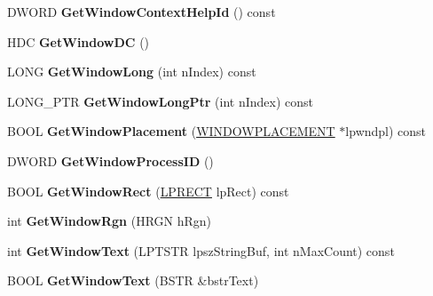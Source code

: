 \begin{DoxyCompactItemize}
D\+W\+O\+RD {\bfseries Get\+Window\+Context\+Help\+Id} () const
\item 
\mbox{\label{class_a_t_l_1_1_c_window_a53978589ef477e3efd9026ae5cb3b772}} 
H\+DC {\bfseries Get\+Window\+DC} ()
\item 
\mbox{\label{class_a_t_l_1_1_c_window_ac70f93a43d47796067d2bdfcb0f471dd}} 
L\+O\+NG {\bfseries Get\+Window\+Long} (int n\+Index) const
\item 
\mbox{\label{class_a_t_l_1_1_c_window_a8e1cdcc97deb1790b73d360453918278}} 
L\+O\+N\+G\+\_\+\+P\+TR {\bfseries Get\+Window\+Long\+Ptr} (int n\+Index) const
\item 
\mbox{\label{class_a_t_l_1_1_c_window_a39f860355ac97945551c84336b110a91}} 
B\+O\+OL {\bfseries Get\+Window\+Placement} (\hyperlink{struct___w_i_n_d_o_w_p_l_a_c_e_m_e_n_t}{W\+I\+N\+D\+O\+W\+P\+L\+A\+C\+E\+M\+E\+NT} $\ast$lpwndpl) const
\item 
\mbox{\label{class_a_t_l_1_1_c_window_aab1857d7335028be41136dfda1830ad2}} 
D\+W\+O\+RD {\bfseries Get\+Window\+Process\+ID} ()
\item 
\mbox{\label{class_a_t_l_1_1_c_window_a7d85282978c6e7f6feefef80c3824979}} 
B\+O\+OL {\bfseries Get\+Window\+Rect} (\hyperlink{structtag_r_e_c_t}{L\+P\+R\+E\+CT} lp\+Rect) const
\item 
\mbox{\label{class_a_t_l_1_1_c_window_a583da937210a043c288d2ab2187c9257}} 
int {\bfseries Get\+Window\+Rgn} (H\+R\+GN h\+Rgn)
\item 
\mbox{\label{class_a_t_l_1_1_c_window_a54838d142922672f63b660fc6e298758}} 
int {\bfseries Get\+Window\+Text} (L\+P\+T\+S\+TR lpsz\+String\+Buf, int n\+Max\+Count) const
\item 
\mbox{\label{class_a_t_l_1_1_c_window_a3d09a28c6bfe092bb7bff4c708928b3b}} 
B\+O\+OL {\bfseries Get\+Window\+Text} (B\+S\+TR \&bstr\+Text)
\item 
\mbox{\label{class_a_t_l_1_1_c_window_a10c13b8bf7d9dfdd8ab1408a8bdff76f}} 

\end{DoxyCompactItemize}
